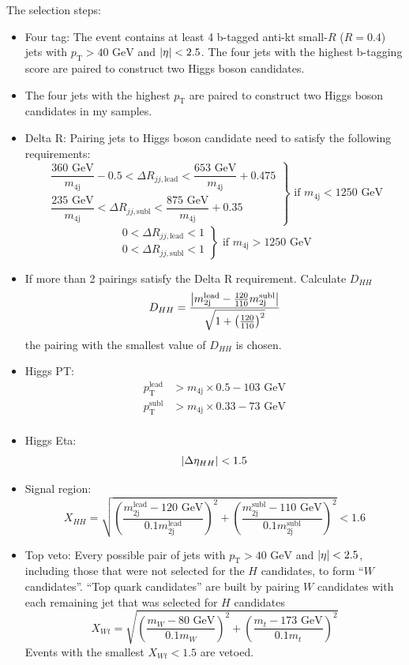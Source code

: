 \documentclass[12pt]{article}
\begin{document}
			The selection steps:
			\begin{itemize}
			\item Four tag: The event contains at least 4 b-tagged anti-kt small-$R$ ($R = 0.4$) jets with $p_\text{T} > \text{40 GeV}$ and $\abs{\eta} < 2.5$. The four jets with the highest b-tagging score are paired to construct two Higgs boson candidates.
			\item The four jets with the highest $p_\text{T}$ are paired to construct two Higgs boson candidates in my samples.
			\item Delta R: Pairing jets to Higgs boson candidate need to satisfy the following requirements:
			\[
				\left.
				\begin{array}{c}
					\dfrac{\text{360 GeV}}{m_\text{4j}} - 0.5 < \Delta R_{jj,\text{lead}} < \dfrac{\text{653 GeV}}{m_{\text{4j}}} + 0.475 \\
					\dfrac{\text{235 GeV}}{m_\text{4j}}  < \Delta R_{jj,\text{subl}} < \dfrac{\text{875 GeV}}{m_{\text{4j}}} + 0.35 
				\end{array} 
				\right\} \text{ if } m_{\text{4j}} <  \text{1250 GeV}
			\] 
			\[
				\left.
				\begin{array}{c}
					0 < \Delta R_{jj,\text{lead}} < 1 \\
					0 < \Delta R_{jj,\text{subl}} < 1 
				\end{array} 
				\right\} \text{ if } m_{\text{4j}} >  \text{1250 GeV}
			\] 
			\item If more than 2 pairings satisfy the Delta R requirement. Calculate $D_{HH}$
			\[
				D_{HH} = \frac{\abs{m_{\text{2j}}^{\text{lead}} - \frac{120}{110} m_{\text{2j}}^{\text{subl}}}}{\sqrt{1 + \left( \frac{120}{110} \right)^2}}
			\] 
			the pairing with the smallest value of $D_{HH}$ is chosen.
			\item Higgs PT: 
			\begin{align*}
				p_{\text{T}}^{\text{lead}} &> m_{\text{4j}} \times 0.5 - \text{103 GeV} \\
				p_{\text{T}}^{\text{subl}} &> m_{\text{4j}} \times 0.33 - \text{73 GeV} \\
			\end{align*}
			\item Higgs Eta: 
			\[
				\abs{\Delta\eta_{HH}} < 1.5
			\] 
			\item Signal region:
			\[
				X_{HH} = \sqrt{\left( \frac{m_{\text{2j}}^{\text{lead}} - \text{120 GeV}}{0.1 m_{\text{2j}}^{\text{lead}}} \right)^2 + \left(\frac{m_{\text{2j}}^{\text{subl}} - \text{110 GeV}}{0.1 m_{\text{2j}}^{\text{subl}}} \right)^2} < 1.6
			\]
			\item Top veto: Every possible pair of jets with $p_\text{T} > \text{40 GeV}$ and $\abs{\eta} < 2.5$, including those that were not selected for the $H$ candidates, to form ``$W$ candidates''. ``Top quark candidates'' are built by pairing $W$ candidates with each remaining jet that was selected for $H$ candidates
			\[
				X_{Wt} = \sqrt{\left( \frac{m_{W} - \text{80 GeV}}{0.1 m_{W}} \right)^2 + \left(\frac{m_{t} - \text{173 GeV}}{0.1 m_{t}} \right)^2} 
			\] 
			Events with the smallest $X_{Wt} < 1.5$ are vetoed.

			\end{itemize}
\end{document}
